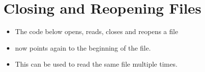 \documentclass[letterpaper,10pt,english]{sphinxmanual}
\begin{document}
\section{Closing and Reopening Files}
\label{\detokenize{lecture_notes/lec13_files_web:closing-and-reopening-files}}\begin{itemize}
\item {} 
The code below opens, reads, closes and reopens a file

%
\begin{sphinxVerbatim}[commandchars=\\\{\}]
  


  
\end{sphinxVerbatim}

\item {} 
 now points again to the beginning of the file.

\item {} 
This can be used to read the same file multiple times.

\end{itemize}
\end{document}
